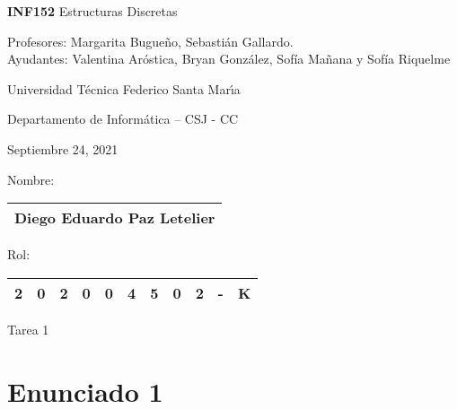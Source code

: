 \documentclass[letterpaper,10pt]{article}
\begin{document}
    
\thispagestyle{empty}
 	
\begin{minipage}[t]{0.6\textwidth}

{\LARGE \textbf{INF152} Estructuras Discretas}

{\large Profesores: Margarita Bugueño, Sebastián Gallardo.}\\
{\large Ayudantes: Valentina Aróstica, Bryan González, Sofía Mañana y Sofía Riquelme}

Universidad T\'ecnica Federico Santa Mar\'{\i}a

Departamento de Inform\'atica -- CSJ - CC 

Septiembre 24, 2021

\end{minipage}
\hfill
\begin{minipage}[t]{0.3\textwidth}
Nombre:

\begin{tabular}{|c|}\hline
    
Diego Eduardo Paz Letelier\\\hline
\end{tabular}

\vspace{0.1cm}

Rol:

\begin{tabular}{|c|c|c|c|c|c|c|c|c|c|c|}\hline

2 & 0 & 2 & 0 & 0 & 4 & 5 & 0 & 2 & - & K\\\hline
\end{tabular}
\end{minipage}

\vspace{0.3cm}

\begin{center}
    \huge Tarea 1
\end{center}



\section{Enunciado 1}
\end{document}
